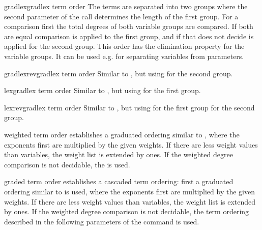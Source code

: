 \begin{Concept}{gradlexgradlex term order}
The terms are separated into two groups where the
second parameter of the  call determines
the length of the first group. For a comparison first
the total degrees of both variable groups are compared.
If both are equal 
 comparison is applied to the first
group, and if that does not decide 
is applied for the second group. This order has the elimination
property for the variable groups. It can be used e.g. for
separating variables from parameters.
\end{Concept}
\begin{Concept}{gradlexrevgradlex term order}
Similar to , but using
 for the second group.
\end{Concept}
\begin{Concept}{lexgradlex term order}
Similar to , but using
 for the first group.
\end{Concept}
\begin{Concept}{lexrevgradlex term order}
Similar to , but using
 for the first group
 for the second group.
\end{Concept}
\begin{Concept}{weighted term order}
establishes a graduated ordering
similar to , where the exponents first are
multiplied by the given weights. If there are less weight values than
variables, the weight list is extended by ones. If the weighted degree
comparison is not decidable, the 
 is used.
\end{Concept}
\begin{Concept}{graded term order}
establishes a cascaded term ordering:  first a graduated ordering
similar to  is used, where the exponents first are
multiplied by the given weights. If there are less weight values than
variables, the weight list is extended by ones. If the weighted degree
comparison is not decidable, the term ordering described in the following
parameters of the  command is used.
\end{Concept}
